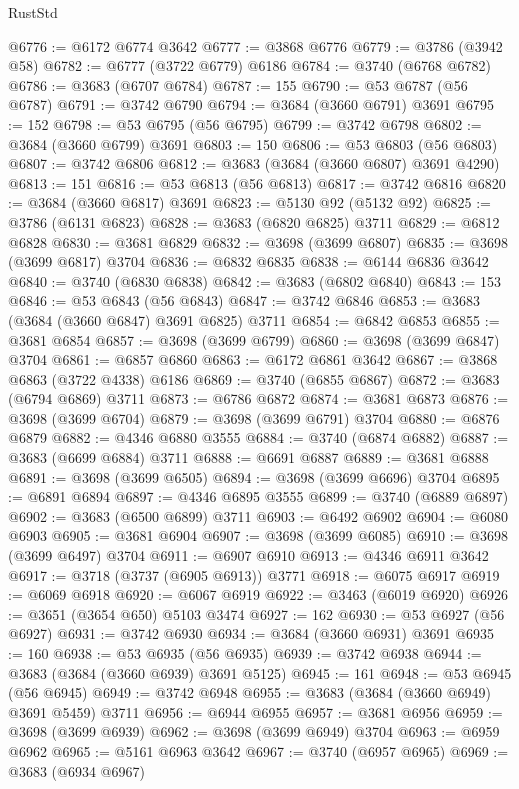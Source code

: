 \begin{lexlean}{RustStd}
\begin{coremodule}
@6776 := @6172 @6774 @3642
@6777 := @3868 @6776
@6779 := @3786 (@3942 @58)
@6782 := @6777 (@3722 @6779) @6186
@6784 := @3740 (@6768 @6782)
@6786 := @3683 (@6707 @6784)
@6787 := 155
@6790 := @53 @6787 (@56 @6787)
@6791 := @3742 @6790
@6794 := @3684 (@3660 @6791) @3691
@6795 := 152
@6798 := @53 @6795 (@56 @6795)
@6799 := @3742 @6798
@6802 := @3684 (@3660 @6799) @3691
@6803 := 150
@6806 := @53 @6803 (@56 @6803)
@6807 := @3742 @6806
@6812 := @3683 (@3684 (@3660 @6807) @3691 @4290)
@6813 := 151
@6816 := @53 @6813 (@56 @6813)
@6817 := @3742 @6816
@6820 := @3684 (@3660 @6817) @3691
@6823 := @5130 @92 (@5132 @92)
@6825 := @3786 (@6131 @6823)
@6828 := @3683 (@6820 @6825) @3711
@6829 := @6812 @6828
@6830 := @3681 @6829
@6832 := @3698 (@3699 @6807)
@6835 := @3698 (@3699 @6817) @3704
@6836 := @6832 @6835
@6838 := @6144 @6836 @3642
@6840 := @3740 (@6830 @6838)
@6842 := @3683 (@6802 @6840)
@6843 := 153
@6846 := @53 @6843 (@56 @6843)
@6847 := @3742 @6846
@6853 := @3683 (@3684 (@3660 @6847) @3691 @6825) @3711
@6854 := @6842 @6853
@6855 := @3681 @6854
@6857 := @3698 (@3699 @6799)
@6860 := @3698 (@3699 @6847) @3704
@6861 := @6857 @6860
@6863 := @6172 @6861 @3642
@6867 := @3868 @6863 (@3722 @4338) @6186
@6869 := @3740 (@6855 @6867)
@6872 := @3683 (@6794 @6869) @3711
@6873 := @6786 @6872
@6874 := @3681 @6873
@6876 := @3698 (@3699 @6704)
@6879 := @3698 (@3699 @6791) @3704
@6880 := @6876 @6879
@6882 := @4346 @6880 @3555
@6884 := @3740 (@6874 @6882)
@6887 := @3683 (@6699 @6884) @3711
@6888 := @6691 @6887
@6889 := @3681 @6888
@6891 := @3698 (@3699 @6505)
@6894 := @3698 (@3699 @6696) @3704
@6895 := @6891 @6894
@6897 := @4346 @6895 @3555
@6899 := @3740 (@6889 @6897)
@6902 := @3683 (@6500 @6899) @3711
@6903 := @6492 @6902
@6904 := @6080 @6903
@6905 := @3681 @6904
@6907 := @3698 (@3699 @6085)
@6910 := @3698 (@3699 @6497) @3704
@6911 := @6907 @6910
@6913 := @4346 @6911 @3642
@6917 := @3718 (@3737 (@6905 @6913)) @3771
@6918 := @6075 @6917
@6919 := @6069 @6918
@6920 := @6067 @6919
@6922 := @3463 (@6019 @6920)
@6926 := @3651 (@3654 @650) @5103 @3474
@6927 := 162
@6930 := @53 @6927 (@56 @6927)
@6931 := @3742 @6930
@6934 := @3684 (@3660 @6931) @3691
@6935 := 160
@6938 := @53 @6935 (@56 @6935)
@6939 := @3742 @6938
@6944 := @3683 (@3684 (@3660 @6939) @3691 @5125)
@6945 := 161
@6948 := @53 @6945 (@56 @6945)
@6949 := @3742 @6948
@6955 := @3683 (@3684 (@3660 @6949) @3691 @5459) @3711
@6956 := @6944 @6955
@6957 := @3681 @6956
@6959 := @3698 (@3699 @6939)
@6962 := @3698 (@3699 @6949) @3704
@6963 := @6959 @6962
@6965 := @5161 @6963 @3642
@6967 := @3740 (@6957 @6965)
@6969 := @3683 (@6934 @6967)

\end{coremodule}
\end{lexlean}
